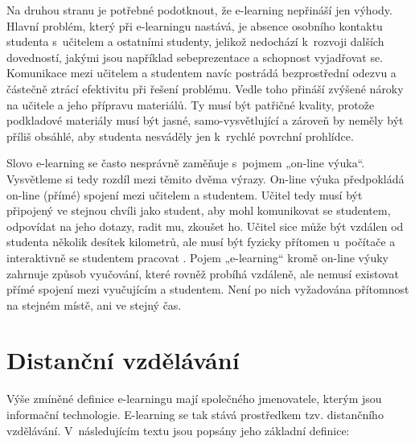 \documentclass[
print,
  11pt,
  table,   
  nolof,    
  nolot,
  oneside,final
]{fithesis3}
\begin{document}
Na druhou stranu je potřebné podotknout, že e-learning nepřináší jen výhody. Hlavní problém, který při e-learningu nastává, je absence osobního kontaktu studenta s~učitelem a ostatními studenty, jelikož nedochází k~rozvoji dalších dovedností, jakými jsou například sebeprezentace a schopnost vyjadřovat se. Komunikace mezi učitelem a studentem navíc postrádá bezprostřední odezvu a částečně ztrácí efektivitu při řešení problému. Vedle toho přináší zvýšené nároky na učitele a jeho přípravu materiálů. Ty musí být patřičné kvality, protože podkladové materiály musí být jasné, samo-vysvětlující a zároveň by neměly být příliš obsáhlé, aby studenta nesváděly jen k~rychlé povrchní prohlídce.

Slovo e-learning se často nesprávně zaměňuje s~pojmem „on-line výuka“. Vysvětleme si tedy rozdíl mezi těmito dvěma výrazy. On-line výuka předpokládá on-line (přímé) spojení mezi učitelem a studentem. Učitel tedy musí být připojený ve stejnou chvíli jako student, aby mohl komunikovat se studentem, odpovídat na jeho dotazy, radit mu, zkoušet ho. Učitel sice může být vzdálen od studenta několik desítek kilometrů, ale musí být fyzicky přítomen u~počítače a interaktivně se studentem pracovat \cite{striteska}. Pojem „e-learn\-ing“ kromě on-line výuky zahrnuje způsob vyučování, které rovněž probíhá vzdáleně, ale nemusí existovat přímé spojení mezi vyučujícím a studentem. Není po nich vyžadována přítomnost na stejném místě, ani ve stejný čas.


	\section{Distanční vzdělávání}

Výše zmíněné definice e-learningu mají společného jmenovatele, kterým jsou informační technologie. E-learning se tak stává prostředkem tzv. distančního vzdělávání. V~následujícím textu jsou popsány jeho základní definice: 
\end{document}
